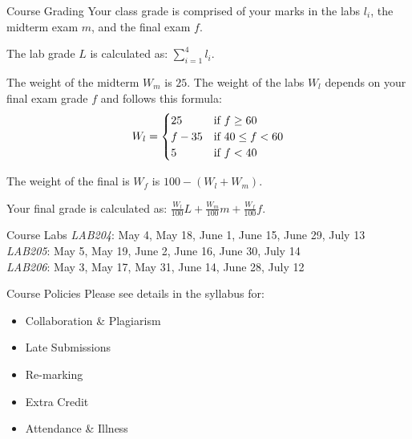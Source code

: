 \documentclass{beamer}
\begin{document}
	\begin{frame}{Course Grading}
	Your class grade is comprised of your marks in the labs $l_{i}$, the midterm exam $m$, and the final exam $f$.

The lab grade $L$ is calculated as: $\sum_{i=1}^{4}l_{i}$.

The weight of the midterm $W_{m}$ is $25$. The weight of the labs $W_{l}$ depends on your final exam grade $f$ and follows this formula:
\[
 W_{l} = \begin{cases}
        25      & $if~$ f \ge 60\\
        f - 35  & $if~$ 40 \le f < 60\\
        5       & $if~$ f < 40
        \end{cases}
\]

The weight of the final is $W_{f}$ is $100 - (W_{l} + W_{m})$.

Your final grade is calculated as: $\frac{W_{l}}{100}L + \frac{W_{m}}{100}m + \frac{W_{f}}{100}f $.
	\end{frame}
	
	\begin{frame}{Course Labs}
		\textit{LAB204}: May 4, May 18, June 1, June 15, June 29, July 13 \\
		\textit{LAB205}: May 5, May 19, June 2, June 16, June 30, July 14 \\
		\textit{LAB206}: May 3, May 17, May 31, June 14, June 28, July 12 
	\end{frame}
  
	\begin{frame}{Course Policies}
	Please see details in the syllabus for: \\
		\begin{itemize}
			\setlength\itemsep{1em}
			\item Collaboration \& Plagiarism
			\item Late Submissions
			\item Re-marking
			\item Extra Credit
			\item Attendance \& Illness
		\end{itemize}
	\end{frame}
	
\end{document}
